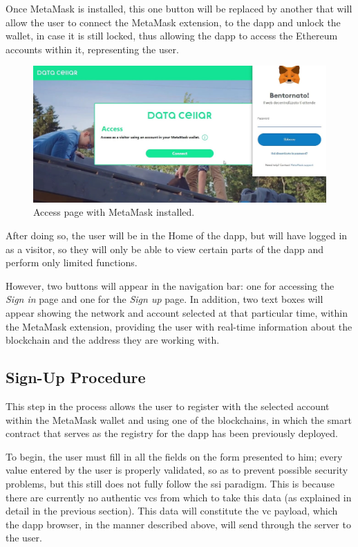 Once MetaMask is installed, this one button will be replaced by another that will allow the user to connect the MetaMask extension, to the \gls{dapp} and unlock the wallet,
in case it is still locked, thus allowing the \gls{dapp} to access the Ethereum accounts within it, representing the user.

\begin{figure}[h]  
  \centering
  \includegraphics[width=1\textwidth]{Images/c6_1.jpg} 
  \caption{Access page with MetaMask installed.}
\end{figure}

After doing so, the user will be in the Home of the \gls{dapp}, but will have logged in as a visitor, so they will only be able to view certain parts of the \gls{dapp} 
and perform only limited functions.

However, two buttons will appear in the navigation bar: one for accessing the \textit{Sign in} page and one for the \textit{Sign up} page. In addition, two text boxes will appear showing the 
network and account selected at that particular time, within the MetaMask extension, providing the user with real-time information about the blockchain and the address they 
are working with.

\subsection{Sign-Up Procedure}

This step in the process allows the user to register with the selected account within the MetaMask wallet and using one of the blockchains, in which the smart contract that 
serves as the registry for the \gls{dapp} has been previously deployed.

To begin, the user must fill in all the fields on the form presented to him; every value entered by the user is properly validated, so as to prevent possible security 
problems, but this still does not fully follow the \gls{ssi} paradigm. This is because there are currently no authentic \gls{vc}s from which to take this data (as 
explained in detail in the previous section). This data will constitute the \gls{vc} payload, which the \gls{dapp} browser, in the manner described above, will send through the 
server to the user.

